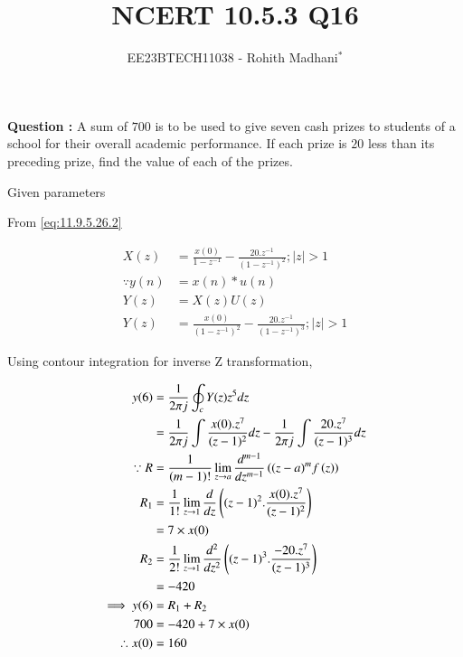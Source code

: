 \documentclass[journal,12pt,twocolumn]{IEEEtran}
\theoremstyle{remark}
\begin{document}

\vspace{3cm}

\title{NCERT 10.5.3 Q16}
\author{EE23BTECH11038 - Rohith Madhani$^{*}$%
}
\maketitle
\newpage
\bigskip
\renewcommand{\thefigure}{\theenumi}
\renewcommand{\thetable}{\theenumi}

\textbf{Question :} A sum of \rupee$700$ is to be used to give seven cash prizes to students of a school for their overall academic performance. If each prize is 
\rupee$20$ less than its preceding prize, find the value of each of the prizes.

\solution 

\begin{table}[!h] 
\centering

\caption{Given parameters}
\label{table:10.5.3.16}
\end{table}

From \eqref{eq:11.9.5.26.2}

\begin{align}
    X(z) &= \frac{x(0)}{1-z^{-1}} - \frac{20.z^{-1}}{(1-z^{-1})^2} ; |z|>1 \\
    \because y(n) &= x(n)*u(n) \\
    Y(z) &= X(z)U(z) \\
    Y(z) &= \frac{x(0)}{(1-z^{-1})^2} - \frac{20.z^{-1}}{(1-z^{-1})^3} ; |z|>1 
\end{align}

Using contour integration for inverse Z transformation, 

\begin{align}
    y(6) &= \frac{1}{2\pi j}\oint_c Y(z) z^{5} dz \\
    &= \frac{1}{2\pi j}\int \frac{x(0).z^{7}}{(z-1)^{2}} dz - \frac{1}{2\pi j}\int \frac{20.z^{7}}{(z-1)^{3}} dz\\
    \because R&=\frac{1}{\left(m-1\right)!}\lim\limits_{z\to a}\frac{d^{m-1}}{dz^{m-1}}\left({(z-a)}^{m}f\left(z\right)\right)\\
    R_1 &=\frac{1}{1!}\lim\limits_{z\to 1}\frac{d}{dz}\left((z-1)^2.\frac{x(0).z^{7}}{(z-1)^{2}}\right)\\
    &= 7 \times x(0)\\
    R_2 &=\frac{1}{2!}\lim\limits_{z\to 1}\frac{d^2}{dz^2}\left((z-1)^3.\frac{-20.z^{7}}{(z-1)^{3}}\right)\\
    &= -420\\
    \implies y(6) &= R_1 + R_2 \\
    700 &= -420 + 7 \times x(0) \\
    \therefore x(0) &= 160
\end{align}
\end{document}

